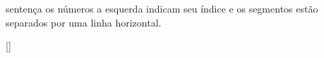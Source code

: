sentença os números a esquerda indicam seu índice e os segmentos estão separados por uma linha horizontal.


















































\ref{}





